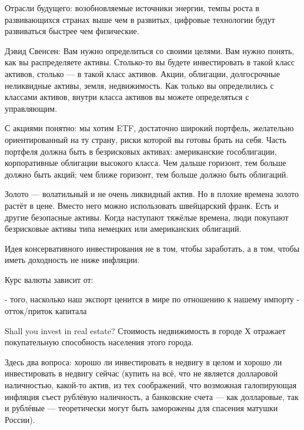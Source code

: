 \documentclass[11pt]{article}
\theoremstyle{remark}
\theoremstyle{definition}
\begin{document}
\begin{enumerate}
Отрасли будущего: возобновляемые источники энергии, темпы роста в развивающихся странах выше чем в развитых, цифровые технологии будут развиваться быстрее чем физические.




Дэвид Свенсен:
Вам нужно определиться со своими целями. Вам нужно понять, как вы распределяете активы. Столько-то вы будете инвестировать в такой класс активов, столько --- в такой класс активов. Акции, облигации, долгосрочные неликвидные активы, земля, недвижимость. Как только вы определились с классами активов, внутри класса активов вы можете определяться с управляющим.


С акциями понятно: мы хотим ETF, достаточно широкий портфель, желательно ориентированный на ту страну, риски которой вы готовы брать на себя. Часть портфеля должна быть в безрисковых активах: американские гособлигации, корпоративные облигации высокого класса. Чем дальше горизонт, тем больше должно быть акций; чем ближе горизонт, тем больше должно быть облигаций.

Золото --- волатильный и не очень ликвидный актив. Но в плохие времена золото растёт в цене. Вместо него можно использовать швейцарский франк. Есть и другие безопасные активы. Когда наступают тяжёлые времена, люди покупают безрисковые активы типа немецких или американских облигаций.



Идея консервативного инвестирования не в том, чтобы заработать, а в том, чтобы иметь доходность не ниже инфляции.





Курс валюты зависит от: 

- того, насколько наш экспорт ценится в мире по отношению к нашему импорту
- отток/приток капитала





Shall you invest in real estate? Стоимость недвижимость в городе Х отражает покупательную способность населения этого города.


Здесь два вопроса: хорошо ли инвестировать в недвигу в целом и хорошо ли инвестировать в недвигу сейчас (купить на всё, что не является долларовой наличностью, какой-то актив, из тех соображений, что возможная галопирующая инфляция съест рублёвую наличность, а банковские счета — как долларовые, так и рублёвые — теоретически могут быть заморожены для спасения матушки России).


\end{enumerate}
\end{document}
